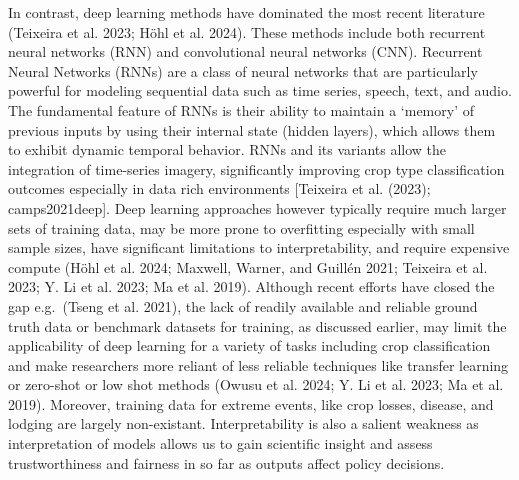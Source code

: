 \documentclass[
  journal,
  twocolumn]{IEEEtran}
\begin{document}
In contrast, deep learning methods have dominated the most recent
literature (Teixeira et al. 2023; Höhl et al. 2024). These methods
include both recurrent neural networks (RNN) and convolutional neural
networks (CNN). Recurrent Neural Networks (RNNs) are a class of neural
networks that are particularly powerful for modeling sequential data
such as time series, speech, text, and audio. The fundamental feature of
RNNs is their ability to maintain a `memory' of previous inputs by using
their internal state (hidden layers), which allows them to exhibit
dynamic temporal behavior. RNNs and its variants allow the integration
of time-series imagery, significantly improving crop type classification
outcomes especially in data rich environments {[}Teixeira et al. (2023);
camps2021deep{]}. Deep learning approaches however typically require
much larger sets of training data, may be more prone to overfitting
especially with small sample sizes, have significant limitations to
interpretability, and require expensive compute (Höhl et al. 2024;
Maxwell, Warner, and Guillén 2021; Teixeira et al. 2023; Y. Li et al.
2023; Ma et al. 2019). Although recent efforts have closed the gap
e.g.~(Tseng et al. 2021), the lack of readily available and reliable
ground truth data or benchmark datasets for training, as discussed
earlier, may limit the applicability of deep learning for a variety of
tasks including crop classification and make researchers more reliant of
less reliable techniques like transfer learning or zero-shot or low shot
methods (Owusu et al. 2024; Y. Li et al. 2023; Ma et al. 2019).
Moreover, training data for extreme events, like crop losses, disease,
and lodging are largely non-existant. Interpretability is also a salient
weakness as interpretation of models allows us to gain scientific
insight and assess trustworthiness and fairness in so far as outputs
affect policy decisions.
\end{document}
